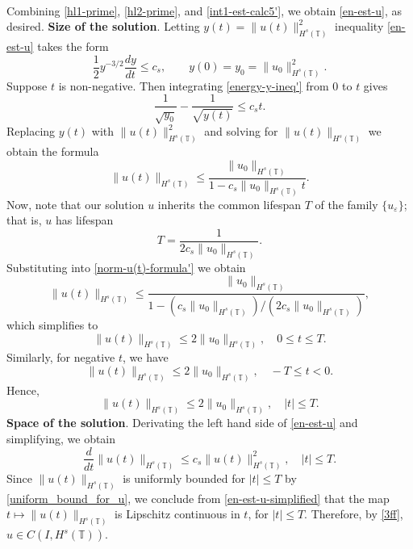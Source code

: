 \documentclass[12pt,reqno]{amsart}
\newcommand{\ci}{\mathbb{T}}
\newcommand{\ee}{\varepsilon}
\theoremstyle{plain}  %
\theoremstyle{definition}
\begin{document}
\begin{appendices}
\begin{equation}
\begin{split}
		\end{split}
	\end{equation}
	Combining \eqref{hl1-prime}, \eqref{hl2-prime},
	and \eqref{int1-est-calc5'}, we obtain \eqref{en-est-u}, as desired.
	\vskip0.1in
	{\bf Size of the solution}. 
	Letting  $y(t)=  \|u(t)\|_{H^s(\ci)}^2$ inequality \eqref{en-est-u}
	takes the form
	\begin{equation} 
		\label{energy-y-ineq'}
		\frac 12
		y^{-3/2}\frac{dy}{dt}
		\le
		c_s,
		\qquad
		y(0)=y_0=  \|u_0\|_{H^s(\ci)}^2.
	\end{equation}
	Suppose $t$ is non-negative. Then integrating  \eqref{energy-y-ineq'}
	from  0 to $t$ gives
	\begin{equation*} 
		\frac{1}{\sqrt{y_0}}  - \frac{1}{\sqrt{y(t)}} 
		\le 
		c_s t.
	\end{equation*}
	Replacing $y(t)$ with   $\|u(t)\|_{H^s(\ci)}^2$  and solving for  $\|u(t)\|_{H^s(\ci)}$
	we obtain the formula
	\begin{equation} 
		\label{norm-u(t)-formula'}
		\|u(t)\|_{H^s(\ci)}
		\le
		\frac{ \|u_0\|_{H^s(\ci)}}{1-c_s\|u_0\|_{H^s(\ci)} t}.
	\end{equation}
	Now, note that our solution $u$ inherits the common lifespan $T$ of the family
	$\{u_\ee\}$; that is, $u$ has lifespan
	\begin{equation*}
		T
		=
		\frac{1}{2 c_s \|u_0\|_{H^s(\ci)}}.
	\end{equation*}
	Substituting into \eqref{norm-u(t)-formula'} we obtain	
	\begin{equation*} 
		\label{u(t)-u(0)-bound'}
		\|u(t)\|_{H^s(\ci)}
		\le
		\frac{ \|u_0\|_{H^s(\ci)}}{1-(c_s\|u_0\|_{H^s(\ci)})/(2 c_s \|u_0\|_{H^s(\ci)})},
	\end{equation*}
	which simplifies to 
	\begin{equation*}
		\|u(t)\|_{H^s(\ci)}
		\le
		2 \|u_0\|_{H^s(\ci)},
		\quad 
		0\le t \le T.
	\end{equation*}
	Similarly, for negative $t$, we have
	\begin{equation*}
		\|u(t)\|_{H^s(\ci)}
		\le
		2 \|u_0\|_{H^s(\ci)},
		\quad 
		-T \le t < 0.
	\end{equation*}
	Hence,
	\begin{equation}
		\label{uniform_bound_for_u}
		\|u(t)\|_{H^s(\ci)}
		\le
		2 \|u_0\|_{H^s(\ci)},
		\quad 
		|t| \le T.
	\end{equation}
		\vskip0.1in
		{\bf Space of the solution}.
	Derivating the left hand side of \eqref{en-est-u} and simplifying, we obtain
	\begin{equation}
		\label{en-est-u-simplified}
	\frac{d}{dt} \|u(t)\|_{H^s(\ci)} \le c_s \|u(t)\|_{H^s(\ci)}^2, \quad |t| \le T.
	\end{equation}
	Since $\|u(t)\|_{H^s(\ci)}$
	is uniformly bounded for $|t| \le T$ by
	\eqref{uniform_bound_for_u}, we conclude from
	\eqref{en-est-u-simplified} that the map $t \mapsto
	\|u(t)\|_{H^s(\ci)}$ is Lipschitz continuous in $t$, for $|t| \le T$.
	Therefore, by \eqref{3ff}, $u \in C(I, H^s(\ci))$. 
	\vskip0.2in
	

\end{appendices}
\end{document}
